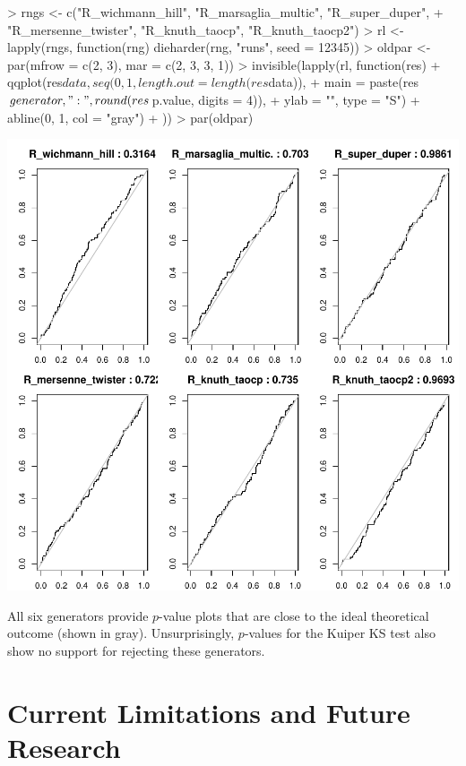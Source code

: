 \documentclass[12pt]{article}
\begin{document}
\begin{center}
  \begin{footnotesize}
%
\begin{Schunk}
\begin{Sinput}
> rngs <- c("R_wichmann_hill", "R_marsaglia_multic", "R_super_duper", 
+     "R_mersenne_twister", "R_knuth_taocp", "R_knuth_taocp2")
> rl <- lapply(rngs, function(rng) dieharder(rng, "runs", seed = 12345))
> oldpar <- par(mfrow = c(2, 3), mar = c(2, 3, 3, 1))
> invisible(lapply(rl, function(res) {
+     qqplot(res$data, seq(0, 1, length.out = length(res$data)), 
+         main = paste(res$generator, ":", round(res$p.value, digits = 4)), 
+         ylab = "", type = "S")
+     abline(0, 1, col = "gray")
+ }))
> par(oldpar)
\end{Sinput}
\end{Schunk}
\includegraphics{RDieHarder-r-rngs}
% 
\end{footnotesize}
\end{center}

All six generators provide $p$-value plots that are close to the ideal
theoretical outcome (shown in gray). Unsurprisingly, $p$-values for the
Kuiper KS test also show no support for rejecting these generators.


\section{Current Limitations and Future Research}
\end{document}

